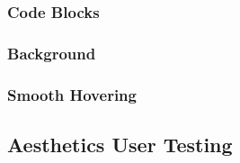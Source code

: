 \subsubsection{Code Blocks}
\subsubsection{Background}
\subsubsection{Smooth Hovering}

\subsection{Aesthetics User Testing}
